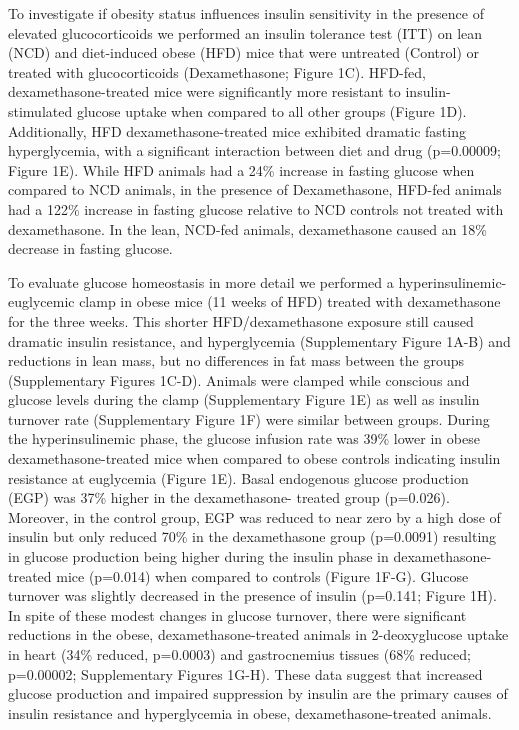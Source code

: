 \documentclass[11pt]{article} %
\begin{document}
To investigate if obesity status influences insulin sensitivity in the
presence of elevated glucocorticoids we performed an insulin tolerance
test (ITT) on lean (NCD) and diet-induced obese (HFD) mice that were
untreated (Control) or treated with glucocorticoids (Dexamethasone;
Figure 1C). HFD-fed, dexamethasone-treated mice were significantly more
resistant to insulin-stimulated glucose uptake when compared to all
other groups (Figure 1D). Additionally, HFD dexamethasone-treated mice
exhibited dramatic fasting hyperglycemia, with a significant interaction
between diet and drug (p=0.00009; Figure 1E). While HFD animals had a
24\% increase in fasting glucose when compared to NCD animals, in the
presence of Dexamethasone, HFD-fed animals had a 122\% increase in
fasting glucose relative to NCD controls not treated with dexamethasone.
In the lean, NCD-fed animals, dexamethasone caused an 18\% decrease in
fasting glucose.

To evaluate glucose homeostasis in more detail we performed a
hyperinsulinemic-euglycemic clamp in obese mice (11 weeks of HFD)
treated with dexamethasone for the three weeks. This shorter
HFD/dexamethasone exposure still caused dramatic insulin resistance, and
hyperglycemia (Supplementary Figure 1A-B) and reductions in lean mass,
but no differences in fat mass between the groups (Supplementary Figures
1C-D). Animals were clamped while conscious and glucose levels during
the clamp (Supplementary Figure 1E) as well as insulin turnover rate
(Supplementary Figure 1F) were similar between groups. During the
hyperinsulinemic phase, the glucose infusion rate was 39\% lower in
obese dexamethasone-treated mice when compared to obese controls
indicating insulin resistance at euglycemia (Figure 1E). Basal
endogenous glucose production (EGP) was 37\% higher in the
dexamethasone- treated group (p=0.026). Moreover, in the control group,
EGP was reduced to near zero by a high dose of insulin but only reduced
70\% in the dexamethasone group (p=0.0091) resulting in glucose
production being higher during the insulin phase in
dexamethasone-treated mice (p=0.014) when compared to controls (Figure
1F-G). Glucose turnover was slightly decreased in the presence of
insulin (p=0.141; Figure 1H). In spite of these modest changes in
glucose turnover, there were significant reductions in the obese,
dexamethasone-treated animals in 2-deoxyglucose uptake in heart (34\%
reduced, p=0.0003) and gastrocnemius tissues (68\% reduced; p=0.00002;
Supplementary Figures 1G-H). These data suggest that increased glucose
production and impaired suppression by insulin are the primary causes of
insulin resistance and hyperglycemia in obese, dexamethasone-treated
animals.
\end{document}
